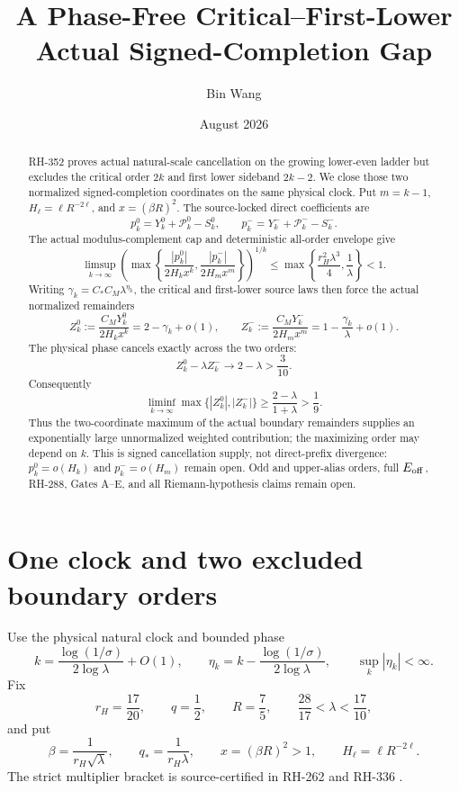 \documentclass[11pt]{article}
\title{A Phase-Free Critical--First-Lower\\Actual Signed-Completion Gap}
\author{Bin Wang}
\date{August 2026}
\theoremstyle{remark}
\newcommand{\cP}{\mathcal P}
\begin{document}
\maketitle

\begin{abstract}
RH-352 proves actual natural-scale cancellation on the growing lower-even
ladder but excludes the critical order $2k$ and first lower sideband
$2k-2$.  We close those two normalized signed-completion coordinates on the
same physical clock.  Put $m=k-1$, $H_\ell=\ell R^{-2\ell}$, and
$x=(\beta R)^2$.  The source-locked direct coefficients are
\[
 p_k^0=Y_k^0+\cP_k^0-S_k^0,
 \qquad p_k^-=Y_k^-+\cP_k^--S_k^-.
\]
The actual modulus-complement cap and deterministic all-order envelope give
\[
 \limsup_{k\to\infty}
 \left(
 \max\left\{
 \frac{|p_k^0|}{2H_kx^k},
 \frac{|p_k^-|}{2H_mx^m}
 \right\}\right)^{1/k}
 \le\max\left\{\frac{r_H^2\lambda^3}{4},\frac1\lambda\right\}<1.
\]
Writing $\gamma_k=C_*C_M\lambda^{\eta_k}$, the critical and first-lower
source laws then force the actual normalized remainders
\[
 Z_k^0:=\frac{C_MY_k^0}{2H_kx^k}=2-\gamma_k+o(1),
 \qquad
 Z_k^-:=\frac{C_MY_k^-}{2H_mx^m}
 =1-\frac{\gamma_k}{\lambda}+o(1).
\]
The physical phase cancels exactly across the two orders:
\[
 Z_k^0-\lambda Z_k^-\longrightarrow2-\lambda>\frac3{10}.
\]
Consequently
\[
 \liminf_{k\to\infty}\max\{|Z_k^0|,|Z_k^-|\}
 \ge\frac{2-\lambda}{1+\lambda}>\frac19.
\]
Thus the two-coordinate maximum of the actual boundary remainders supplies an
exponentially large unnormalized weighted contribution; the maximizing order
may depend on $k$.  This is signed cancellation supply,
not direct-prefix divergence: $p_k^0=o(H_k)$ and $p_k^-=o(H_m)$ remain open.
Odd and upper-alias orders, full $E_{\rm off}$, RH-288, Gates A--E, and all
Riemann-hypothesis claims remain open.
\end{abstract}

\section{One clock and two excluded boundary orders}

Use the physical natural clock and bounded phase
\begin{equation}\label{eq:clock}
 k=\frac{\log(1/\sigma)}{2\log\lambda}+O(1),
 \qquad
 \eta_k=k-\frac{\log(1/\sigma)}{2\log\lambda},
 \qquad \sup_k|\eta_k|<\infty.
\end{equation}
Fix
\begin{equation}\label{eq:constants}
 r_H=\frac{17}{20},\qquad q=\frac12,\qquad R=\frac75,
 \qquad \frac{28}{17}<\lambda<\frac{17}{10},
\end{equation}
and put
\begin{equation}\label{eq:scales}
 \beta=\frac1{r_H\sqrt\lambda},\qquad
 q_*=\frac1{r_H\lambda},\qquad
 x=(\beta R)^2>1,
 \qquad H_\ell=\ell R^{-2\ell}.
\end{equation}
The strict multiplier bracket is source-certified in RH-262 and RH-336
\citep{WangBoundaryBudget2026,WangProjectorMass2026}.
\end{document}
